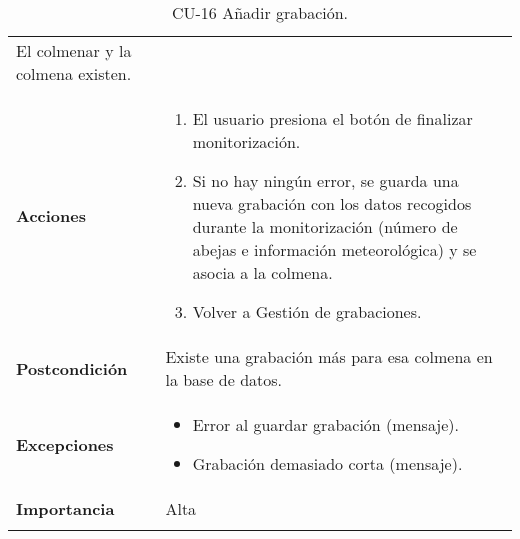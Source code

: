 \begin{longtable}[H]{@{}ll@{}}
\begin{minipage}[t]{0.68\columnwidth}
El colmenar y la colmena existen.\strut
\end{minipage}\tabularnewline
\begin{minipage}[t]{0.26\columnwidth}\raggedright\strut
\textbf{Acciones}\strut
\end{minipage} & \begin{minipage}[t]{0.68\columnwidth}\raggedright\strut
\begin{enumerate}
\def\labelenumi{\arabic{enumi}.}
\tightlist
\item
  El usuario presiona el botón de finalizar monitorización.
\item
  Si no hay ningún error, se guarda una nueva grabación con los datos
  recogidos durante la monitorización (número de abejas e información
  meteorológica) y se asocia a la colmena.
\item
  Volver a Gestión de grabaciones.
\end{enumerate}\strut
\end{minipage}\tabularnewline
\begin{minipage}[t]{0.26\columnwidth}\raggedright\strut
\textbf{Postcondición}\strut
\end{minipage} & \begin{minipage}[t]{0.68\columnwidth}\raggedright\strut
Existe una grabación más para esa colmena en la base de datos.\strut
\end{minipage}\tabularnewline
\begin{minipage}[t]{0.26\columnwidth}\raggedright\strut
\textbf{Excepciones}\strut
\end{minipage} & \begin{minipage}[t]{0.68\columnwidth}\raggedright\strut
\begin{itemize}
\tightlist
\item
  Error al guardar grabación (mensaje).
\item
  Grabación demasiado corta (mensaje).
\end{itemize}\strut
\end{minipage}\tabularnewline
\begin{minipage}[t]{0.26\columnwidth}\raggedright\strut
\textbf{Importancia}\strut
\end{minipage} & \begin{minipage}[t]{0.68\columnwidth}\raggedright\strut
Alta\strut
\end{minipage}\tabularnewline
\bottomrule
\caption{CU-16 Añadir grabación.}
\end{longtable}

